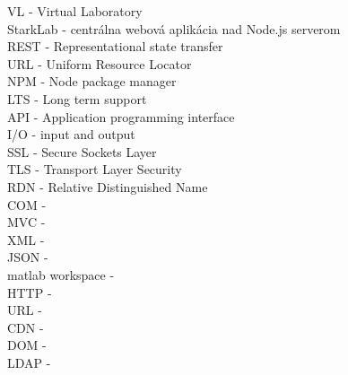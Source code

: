 VL - Virtual Laboratory\\
StarkLab - centrálna webová aplikácia nad Node.js serverom\\
REST - Representational state transfer\\
URL - Uniform Resource Locator\\
NPM - Node package manager\\
LTS - Long term support\\
API - Application programming interface\\
I/O - input and output\\
SSL - Secure Sockets Layer\\
TLS - Transport Layer Security\\
RDN - Relative Distinguished Name\\
COM - \\
MVC - \\
XML - \\
JSON - \\
matlab workspace - \\
HTTP - \\
URL - \\
CDN - \\
DOM - \\
LDAP - \\

